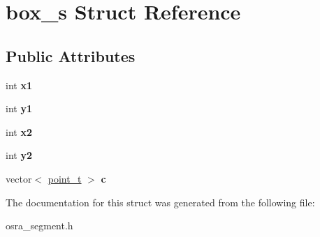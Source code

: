 \hypertarget{structbox__s}{\section{box\-\_\-s Struct Reference}
\label{structbox__s}
}
\subsection*{Public Attributes}
\begin{DoxyCompactItemize}
\item 
\hypertarget{structbox__s_ab575b7c3fc63fe9b8cc799c600462720}{int {\bfseries x1}}\label{structbox__s_ab575b7c3fc63fe9b8cc799c600462720}

\item 
\hypertarget{structbox__s_af4417865c1ca3e341d9c9fea2b2d0540}{int {\bfseries y1}}\label{structbox__s_af4417865c1ca3e341d9c9fea2b2d0540}

\item 
\hypertarget{structbox__s_ab3c6be16fdd179689b6e17416413eea5}{int {\bfseries x2}}\label{structbox__s_ab3c6be16fdd179689b6e17416413eea5}

\item 
\hypertarget{structbox__s_aadc7f8ac5d4f493f244d399b8c360336}{int {\bfseries y2}}\label{structbox__s_aadc7f8ac5d4f493f244d399b8c360336}

\item 
\hypertarget{structbox__s_a655c7d908bd9f1560cb182957af2c302}{vector$<$ \hyperlink{structpoint__s}{point\-\_\-t} $>$ {\bfseries c}}\label{structbox__s_a655c7d908bd9f1560cb182957af2c302}

\end{DoxyCompactItemize}


The documentation for this struct was generated from the following file\-:\begin{DoxyCompactItemize}
\item 
osra\-\_\-segment.\-h\end{DoxyCompactItemize}

